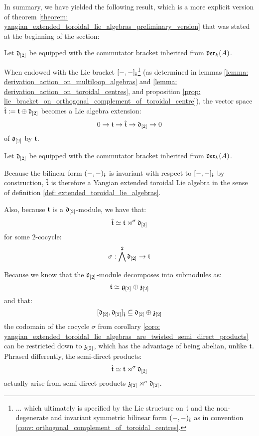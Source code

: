         In summary, we have yielded the following result, which is a more explicit version of theorem \ref{theorem: yangian_extended_toroidal_lie_algebras_preliminary_version} that was stated at the beginning of the section:
        \begin{theorem} \label{theorem: extended_toroidal_lie_algebras}
            Let $\mathfrak{d}_{[2]}$ be equipped with the commutator bracket inherited from $\mathfrak{der}_k(A)$.
        
            When endowed with the Lie bracket $[-, -]_{\hat{\mathfrak{t}}}$\footnote{... which ultimately is specified by the Lie structure on $\mathfrak{t}$ and the non-degenerate and invariant symmetric bilinear form $(-, -)_{\hat{\mathfrak{t}}}$ as in convention \ref{conv: orthogonal_complement_of_toroidal_centres}.} (as determined in lemmas \ref{lemma: derivation_action_on_multiloop_algebras} and \ref{lemma: derivation_action_on_toroidal_centres}, and proposition \ref{prop: lie_bracket_on_orthogonal_complement_of_toroidal_centre}), the vector space $\hat{\mathfrak{t}} := \mathfrak{t} \oplus \mathfrak{d}_{[2]}$ becomes a Lie algebra extension:
                $$0 \to \mathfrak{t} \to \hat{\mathfrak{t}} \to \mathfrak{d}_{[2]} \to 0$$
            of $\mathfrak{d}_{[2]}$ by $\mathfrak{t}$. 
        \end{theorem}
        \begin{corollary} \label{coro: yangian_extended_toroidal_lie_algebras_are_twisted_semi_direct_products}
            Let $\mathfrak{d}_{[2]}$ be equipped with the commutator bracket inherited from $\mathfrak{der}_k(A)$.
        
            Because the bilinear form $(-, -)_{\hat{\mathfrak{t}}}$ is invariant with respect to $[-, -]_{\hat{\mathfrak{t}}}$ by construction, $\hat{\mathfrak{t}}$ is therefore a Yangian extended toroidal Lie algebra in the sense of definition \ref{def: extended_toroidal_lie_algebras}.

            Also, because $\mathfrak{t}$ is a $\mathfrak{d}_{[2]}$-module, we have that:
                $$\hat{\mathfrak{t}} \simeq \mathfrak{t} \rtimes^{\sigma} \mathfrak{d}_{[2]}$$
            for some $2$-cocycle:
                $$\sigma: \bigwedge^2 \mathfrak{d}_{[2]} \to \mathfrak{t}$$
        \end{corollary}
        \begin{remark}
            Because we know that the $\mathfrak{d}_{[2]}$-module decomposes into submodules as:
                $$\mathfrak{t} \simeq \mathfrak{g}_{[2]} \oplus \mathfrak{z}_{[2]}$$
            and that:
                $$[\mathfrak{d}_{[2]}, \mathfrak{d}_{[2]}]_{\hat{\mathfrak{t}}} \subseteq \mathfrak{d}_{[2]} \oplus \mathfrak{z}_{[2]}$$
            the codomain of the cocycle $\sigma$ from corollary \ref{coro: yangian_extended_toroidal_lie_algebras_are_twisted_semi_direct_products} can be restricted down to $\mathfrak{z}_{[2]}$, which has the advantage of being abelian, unlike $\mathfrak{t}$. Phrased differently, the semi-direct products:
                $$\hat{\mathfrak{t}} \simeq \mathfrak{t} \rtimes^{\sigma} \mathfrak{d}_{[2]}$$
            actually arise from semi-direct products $\mathfrak{z}_{[2]} \rtimes^{\sigma} \mathfrak{d}_{[2]}$.  
        \end{remark}
        
